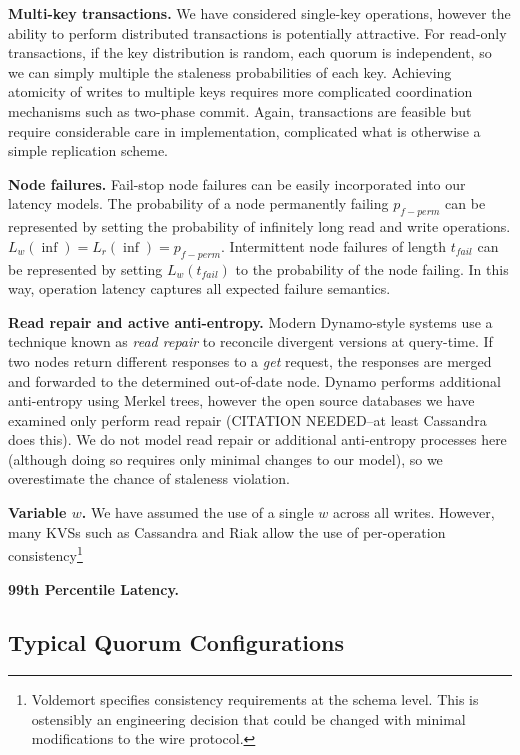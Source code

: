 \documentclass{vldb}
\begin{document}
\textbf{Multi-key transactions.} We have considered single-key operations,
however the ability to perform distributed transactions is potentially
attractive.  For read-only transactions, if the key distribution is
random, each quorum is independent, so we can simply multiple the
staleness probabilities of each key.  Achieving atomicity of writes to
multiple keys requires more complicated coordination mechanisms such
as two-phase commit.  Again, transactions are feasible but require
considerable care in implementation, complicated what is otherwise a
simple replication scheme.

\textbf{Node failures.} Fail-stop node failures can be easily
incorporated into our latency models. The probability of a node
permanently failing $p_{f-perm}$ can be represented by setting the
probability of infinitely long read and write
operations. $L_{w}(\inf)=L_{r}(\inf)=p_{f-perm}$.  Intermittent node
failures of length $t_{fail}$ can be represented by setting
$L_{w}(t_{fail})$ to the probability of the node failing.  In this
way, operation latency captures all expected failure semantics.

\textbf{Read repair and active anti-entropy.} Modern Dynamo-style
systems use a technique known as \textit{read repair} to reconcile
divergent versions at query-time.  If two nodes return different
responses to a \textit{get} request, the responses are merged and
forwarded to the determined out-of-date node.  Dynamo performs
additional anti-entropy using Merkel trees, however the open source
databases we have examined only perform read repair (CITATION
NEEDED--at least Cassandra does this). We do not model read repair or
additional anti-entropy processes here (although doing so requires
only minimal changes to our model), so we overestimate the chance of
staleness violation.

\textbf{Variable $w$.} We have assumed the use of a single $w$ across
all writes.  However, many KVSs such as Cassandra and Riak allow the
use of per-operation consistency\footnote{Voldemort specifies
  consistency requirements at the schema level. This is ostensibly an
  engineering decision that could be changed with minimal
  modifications to the wire protocol.}

\textbf{99th Percentile Latency.}

\subsection{Typical Quorum Configurations}
\end{document}
